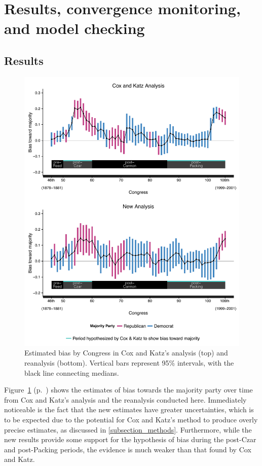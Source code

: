 \section{Results, convergence monitoring, and model checking}


\subsection{Results}
\label{subsection_results}

\begin{figure}
\centering
\includegraphics[scale=0.75]{sections/figs/ck_replication}
\caption{Estimated bias by Congress in Cox and Katz's analysis (top) and reanalysis (bottom). Vertical bars represent 95\%  intervals, with the black line connecting medians.}
\label{fig:ck_bias}
\end{figure}

Figure~\ref{fig:ck_bias} (p.~\pageref{fig:ck_bias}) shows the estimates of bias towards the majority party over time from Cox and Katz's analysis and the reanalysis conducted here. Immediately noticeable is the fact that the new estimates have greater uncertainties, which is to be expected due to the potential for Cox and Katz's method to produce overly precise estimates, as discussed in \ref{subsection_methods}. Furthermore, while the new results provide some support for the hypothesis of bias during the post-Czar and post-Packing periods, the evidence is much weaker than that found by Cox and Katz. 


